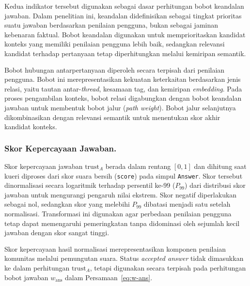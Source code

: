 Kedua indikator tersebut digunakan sebagai dasar perhitungan bobot keandalan jawaban. Dalam penelitian ini, keandalan didefinisikan sebagai tingkat prioritas suatu jawaban berdasarkan penilaian pengguna, bukan sebagai jaminan kebenaran faktual. Bobot keandalan digunakan untuk memprioritaskan kandidat konteks yang memiliki penilaian pengguna lebih baik, sedangkan relevansi kandidat terhadap pertanyaan tetap diperhitungkan melalui kemiripan semantik.

Bobot hubungan antarpertanyaan diperoleh secara terpisah dari penilaian pengguna. Bobot ini merepresentasikan kekuatan keterkaitan berdasarkan jenis relasi, yaitu tautan antar-\emph{thread}, kesamaan tag, dan kemiripan \emph{embedding}. Pada proses pengambilan konteks, bobot relasi digabungkan dengan bobot keandalan jawaban untuk membentuk bobot jalur (\emph{path weight}). Bobot jalur selanjutnya dikombinasikan dengan relevansi semantik untuk menentukan skor akhir kandidat konteks.

\subsubsection{Skor Kepercayaan Jawaban.}
Skor kepercayaan jawaban $\mathrm{trust}_A$ berada dalam rentang $[0,1]$ dan dihitung saat kueri diproses dari skor suara bersih (\texttt{score}) pada simpul \texttt{Answer}. Skor tersebut dinormalisasi secara logaritmik terhadap persentil ke-99 ($P_{99}$) dari distribusi skor jawaban untuk mengurangi pengaruh nilai ekstrem. Skor negatif diperlakukan sebagai nol, sedangkan skor yang melebihi $P_{99}$ dibatasi menjadi satu setelah normalisasi. Transformasi ini digunakan agar perbedaan penilaian pengguna tetap dapat memengaruhi pemeringkatan tanpa didominasi oleh sejumlah kecil jawaban dengan skor sangat tinggi.

Skor kepercayaan hasil normalisasi merepresentasikan komponen penilaian komunitas melalui pemungutan suara. Status \emph{accepted answer} tidak dimasukkan ke dalam perhitungan $\mathrm{trust}_A$, tetapi digunakan secara terpisah pada perhitungan bobot jawaban $w_{\mathrm{ans}}$ dalam Persamaan~\eqref{eq:w-ans}.

